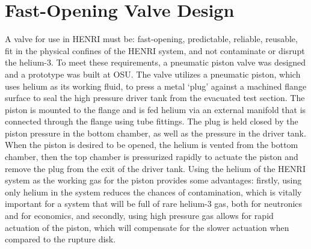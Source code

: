 \section{Fast-Opening Valve Design} \label{s:design}
A valve for use in HENRI must be: fast-opening, predictable, reliable, reusable, fit in the physical confines of the HENRI system, and not contaminate or disrupt the helium-3. 
To meet these requirements, a pneumatic piston valve was designed and a prototype was built at OSU. The valve utilizes a pneumatic piston, which uses helium as its working fluid, to press a metal `plug' against a machined flange surface to seal the high pressure driver tank from the evacuated test section. The piston is mounted to the flange and is fed helium via an external manifold that is connected through the flange using tube fittings. The plug is held closed by the piston pressure in the bottom chamber, as well as the pressure in the driver tank. When the piston is desired to be opened, the helium is vented from the bottom chamber, then the top chamber is pressurized rapidly to actuate the piston and remove the plug from the exit of the driver tank. Using the helium of the HENRI system as the working gas for the piston provides some advantages: firstly, using only helium in the system reduces the chances of contamination, which is vitally important for a system that will be full of rare helium-3 gas, both for neutronics and for economics, and secondly, using high pressure gas allows for rapid actuation of the piston, which will compensate for the slower actuation when compared to the rupture disk.



